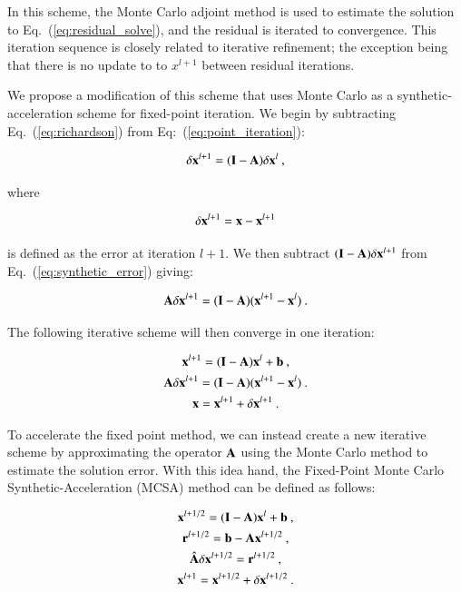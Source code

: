 \documentclass[preprint,12pt]{elsarticle}
\newcommand{\vA}{\ensuremath{\ve{A}}}
\newcommand{\vb}{\ensuremath{\ve{b}}}
\newcommand{\vx}{\ensuremath{\ve{x}}}
\newcommand{\vr}{\ensuremath{\ve{r}}}
\newcommand{\vI}{\ensuremath{\ve{I}}}
\begin{document}
In this scheme, the Monte Carlo adjoint method is used to estimate the
solution to Eq.~(\ref{eq:residual_solve}), and the residual is
iterated to convergence.  This iteration sequence is closely related
to iterative refinement; the exception being that there is no update
to to $x^{l+1}$ between residual iterations.

We propose a modification of this scheme that uses Monte Carlo as a
synthetic-acceleration scheme for fixed-point iteration. We begin by
subtracting Eq.~(\ref{eq:richardson}) from Eq:~(\ref{eq:point_iteration}):

\begin{equation}
  \delta \vx^{l+1} = (\vI - \vA)\delta \vx^{l}\:,
  \label{eq:synthetic_error}
\end{equation}

where

\begin{equation}
  \delta \vx^{l+1} = \vx - \vx^{l+1}
  \label{eq:lplus1error}
\end{equation}

is defined as the error at iteration $l+1$. We then subtract
$(\vI-\vA) \delta \vx^{l+1}$ from Eq.~(\ref{eq:synthetic_error}) giving:

\begin{equation}
  \vA \delta \vx^{l+1} = (\vI - \vA)(\vx^{l+1} - \vx^{l})\:.
  \label{eq:synthetic_error2}
\end{equation}

The following iterative scheme will then converge in one iteration:

\begin{subequations}
  \begin{gather}
    \vx^{l+1} = (\vI - \vA)\vx^l + \vb\:,\\
    \vA \delta \vx^{l+1} = (\vI - \vA)(\vx^{l+1} - \vx^{l})\:.
    \label{eq:synthetic-residual_solve}\\ 
    \vx=\vx^{l+1}+\delta\vx^{l+1}\:.
  \end{gather}
  \label{eq:general-synthetic}
\end{subequations}

To accelerate the fixed point method, we can instead create a new
iterative scheme by approximating the operator $\vA$ using the Monte
Carlo method to estimate the solution error. With this idea hand, the
Fixed-Point Monte Carlo Synthetic-Acceleration (MCSA) method can be
defined as follows:

\begin{subequations}
  \begin{gather}
    \vx^{l+1/2} = (\vI - \vA)\vx^l + \vb\:,\\
    \vr^{l+1/2} = \vb - \vA\vx^{l+1/2}\:,
    \label{eq:MCSA-residual}\\     
    \hat{\vA}\delta\vx^{l+1/2} = \vr^{l+1/2}\:,
    \label{eq:MCSA-residual_solve}\\ 
    \vx^{l+1}=\vx^{l+1/2}+\delta\vx^{l+1/2}\:.
  \end{gather}
  \label{eq:general-MCSA}
\end{subequations}
\end{document}
